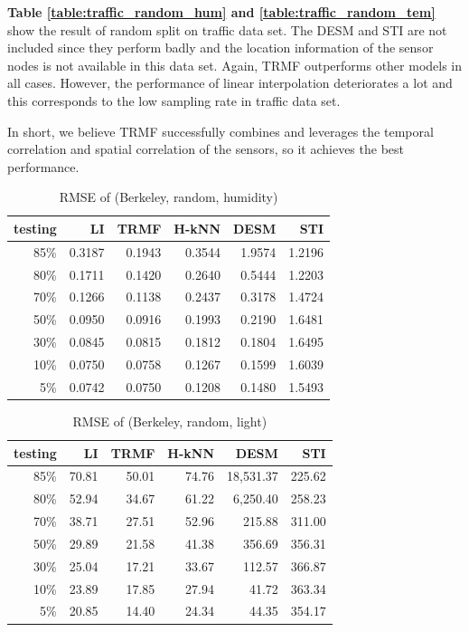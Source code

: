 \textbf{Table \ref{table:traffic_random_hum} and \ref{table:traffic_random_tem}} show the result of random split on traffic data set. The DESM and STI are not included since they perform badly and the location information of the sensor nodes is not available in this data set. Again, TRMF outperforms other models in all cases. However, the performance of linear interpolation deteriorates a lot and this corresponds to the low sampling rate in traffic data set. 

In short, we believe TRMF successfully combines and leverages the temporal correlation and spatial correlation of the sensors, so it achieves the best performance. %

\begin{table}[htbp]
\centering
\caption{RMSE of (Berkeley, random, humidity)}
\label{table:berkeley_random_hum}
\begin{tabular}{ r | r r r r r}
	testing	&LI	&TRMF	&H-kNN	&DESM	&STI\\ \hline
	85\%	&0.3187	&0.1943	&0.3544	&1.9574	&1.2196\\ 
	80\%	&0.1711	&0.1420	&0.2640	&0.5444	&1.2203\\
	70\%	&0.1266	&0.1138	&0.2437	&0.3178	&1.4724\\
	50\%	&0.0950	&0.0916	&0.1993	&0.2190	&1.6481\\
	30\%	&0.0845	&0.0815	&0.1812	&0.1804	&1.6495\\
	10\%	&0.0750	&0.0758	&0.1267	&0.1599	&1.6039\\
	 5\%	&0.0742	&0.0750	&0.1208	&0.1480	&1.5493\\
\end{tabular}
\end{table}

\begin{table} [htbp]
\centering
\caption{RMSE of (Berkeley, random, light)}
\label{table:berkeley_random_light}
\begin{tabular}{ r | r r r r r}
	testing	&LI	&TRMF	&H-kNN	&DESM	&STI\\ \hline
	85\%	&70.81	&50.01	&74.76	&18,531.37	&225.62\\
	80\%	&52.94	&34.67	&61.22	&6,250.40	&258.23\\
	70\%	&38.71	&27.51	&52.96	&215.88	&311.00\\
	50\%	&29.89	&21.58	&41.38	&356.69	&356.31\\
	30\%	&25.04	&17.21	&33.67	&112.57	&366.87\\
	10\%	&23.89	&17.85	&27.94	&41.72	&363.34\\
	 5\%	&20.85	&14.40	&24.34	&44.35	&354.17\\
\end{tabular}
\end{table}

